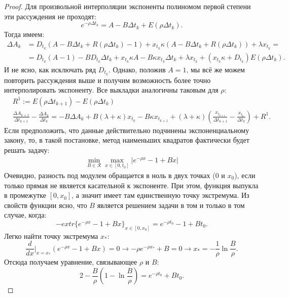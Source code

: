 \begin{appendices}
\begin{proof}
        Для произвольной интерполяции экспоненты полиномом первой степени эти рассуждения не проходят:
        \begin{equation*}
                e^{- \rho \Delta t_k} = A - B \Delta t_k + E (\rho \Delta t_k).
        \end{equation*}
        Тогда имеем:
        \begin{align*}
                \Delta A_k &= D_{t_k} (A - B \Delta t_k + R (\rho \Delta t_k) - 1) + 
                x_{t_k} \kappa (A - B \Delta t_k + R (\rho \Delta t_k)) + \lambda x_{t_k} =\\
                &= D_{t_k} (A - 1) - B D_{t_k} \Delta t_k + x_{t_k} \kappa A 
                - B \kappa x_{t_k} \Delta t_k + \lambda x_{t_k} + (x_{t_k} \kappa + D_{t_k}) E (\rho \Delta t_k).
        \end{align*}
        И не ясно, как исключать ряд $D_{t_k}$. Однако, положив $A = 1$, мы всё же можем повторить рассуждения выше и получим возможность
        более точно интерполировать экспоненту. Все выкладки аналогичны таковым для $\rho$:
        \begin{align*}
                & R^1 := E (\rho \Delta t_{k+1}) - E (\rho \Delta t_k) \\
                & \frac{\Delta A_{k+1}}{\Delta t_{k+1}} - \frac{\Delta A_{k}}{\Delta t_{k}} = 
                -B \Delta A_k + B (\lambda + \kappa) x_{t_k} - B \kappa x_{t_{k+1}} 
                + (\lambda + \kappa) \left(\frac{x_{t_{k+1}}}{\Delta t_{k+1}} - \frac{x_{t_k}}{\Delta t_{k}}\right) + R^1.
        \end{align*} 
        Если предположить, что данные действительно подчинены экспоненциальному закону, то, в такой постановке, метод наименьших 
        квадратов фактически будет решать задачу:
        \begin{align*}
        \min _{B \in \mathcal{R}} \max _{x \in [0, t_0]} |e^{-\rho x} - 1 + B x|
        \end{align*} 
        Очевидно, разность под модулем обращается в ноль в двух точках ($0$ и $x_0$), если только прямая не является касательной к экспоненте.
        При этом, функция выпукла в промежутке $[0, x_0]$, а значит имеет там единственную точку экстремума. Из свойств функции ясно, что $B$ 
        является решением задачи в том и только в том случае, когда:
        \begin{equation*}
                - extr \{e^{-\rho x} - 1 + B x \}_{x \in [0, x_0]} = e^{-\rho t_0} - 1 + B t_0.
        \end{equation*} 
        Легко найти точку экстремума $x_*$:
        \begin{equation*}
                \frac{d}{dx} \Big| _{x=x_*} (e^{-\rho x} - 1 + B x) = 0 \rightarrow -\rho e^{-\rho x_*} + B = 0 \rightarrow x_* = -\frac{1}{\rho} \ln \frac{B}{\rho}.
        \end{equation*} 
        Отсюда получаем уравнение, связывающее $\rho$ и $B$:
        \begin{equation*}
                2 - \frac{B}{\rho}\left(1 - \ln \frac{B}{\rho}\right) = e^{- \rho t_0} + B t_0.
        \end{equation*} 



\end{proof}
\end{appendices}
